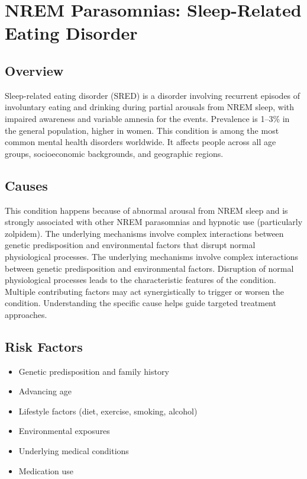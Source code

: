 \chapter{NREM Parasomnias: Sleep-Related Eating Disorder}
\label{sec:Sleep-Related Eating Disorder}

\section{Overview}
Sleep-related eating disorder (SRED) is a disorder involving recurrent episodes of involuntary eating and drinking during partial arousals from NREM sleep, with impaired awareness and variable amnesia for the events. Prevalence is 1--3\% in the general population, higher in women. This condition is among the most common mental health disorders worldwide. It affects people across all age groups, socioeconomic backgrounds, and geographic regions.
\section{Causes}
This condition happens because of abnormal arousal from NREM sleep and is strongly associated with other NREM parasomnias and hypnotic use (particularly zolpidem). The underlying mechanisms involve complex interactions between genetic predisposition and environmental factors that disrupt normal physiological processes. The underlying mechanisms involve complex interactions between genetic predisposition and environmental factors. Disruption of normal physiological processes leads to the characteristic features of the condition. Multiple contributing factors may act synergistically to trigger or worsen the condition. Understanding the specific cause helps guide targeted treatment approaches.
\section{Risk Factors}


\begin{itemize}[noitemsep]
  \item Genetic predisposition and family history
  \item Advancing age
  \item Lifestyle factors (diet, exercise, smoking, alcohol)
  \item Environmental exposures
  \item Underlying medical conditions
  \item Medication use
\end{itemize}
